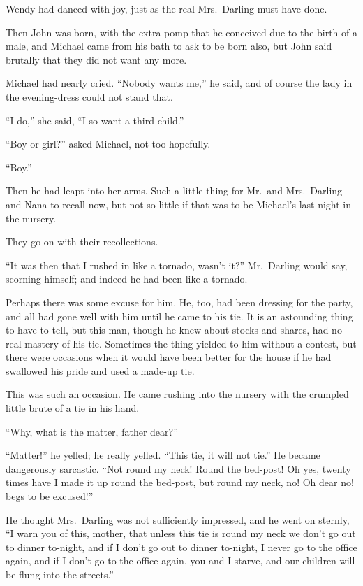 Wendy had danced with joy, just as the real Mrs.\ Darling must have done.

Then John was born, with the extra pomp that he conceived due to the birth of a
male, and Michael came from his bath to ask to be born also, but John said
brutally that they did not want any more.

Michael had nearly cried. ``Nobody wants me,'' he said, and of course the lady
in the evening-dress could not stand that.

``I do,'' she said, ``I so want a third child.''

``Boy or girl?'' asked Michael, not too hopefully.

``Boy.''

Then he had leapt into her arms. Such a little thing for Mr.\ and Mrs.\ Darling
and Nana to recall now, but not so little if that was to be Michael's last night
in the nursery.

They go on with their recollections.

``It was then that I rushed in like a tornado, wasn't it?'' Mr.\ Darling would
say, scorning himself; and indeed he had been like a tornado.

Perhaps there was some excuse for him. He, too, had been dressing for the party,
and all had gone well with him until he came to his tie. It is an astounding
thing to have to tell, but this man, though he knew about stocks and shares, had
no real mastery of his tie. Sometimes the thing yielded to him without a
contest, but there were occasions when it would have been better for the house
if he had swallowed his pride and used a made-up tie.

This was such an occasion. He came rushing into the nursery with the crumpled
little brute of a tie in his hand.

``Why, what is the matter, father dear?''

``Matter!'' he yelled; he really yelled. ``This tie, it will not tie.'' He
became dangerously sarcastic. ``Not round my neck! Round the bed-post! Oh yes,
twenty times have I made it up round the bed-post, but round my neck, no! Oh
dear no! begs to be excused!''

He thought Mrs.\ Darling was not sufficiently impressed, and he went on sternly,
``I warn you of this, mother, that unless this tie is round my neck we don't go
out to dinner to-night, and if I don't go out to dinner to-night, I never go to
the office again, and if I don't go to the office again, you and I starve, and
our children will be flung into the streets.''

